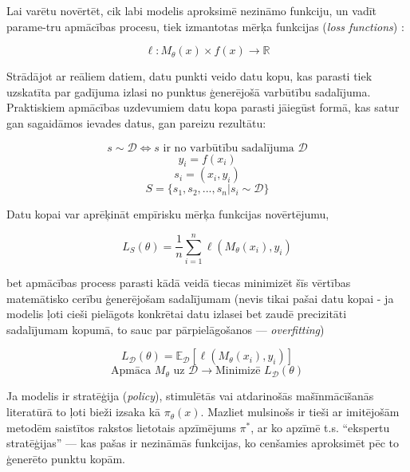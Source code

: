 \documentclass[12pt, a4paper]{article}
\numberwithin{equation}{section} %
\begin{document}
Lai varētu novērtēt, cik labi modelis aproksimē nezināmo funkciju, un vadīt parame-tru apmācības procesu, tiek izmantotas mērķa funkcijas (\textit{loss functions}) \cite{notation}:

\begin{equation} 
    \ell: M_{\theta}(x) \times f(x) \rightarrow \mathbb{R}
\end{equation}

Strādājot ar reāliem datiem, datu punkti veido datu kopu, kas parasti tiek uzskatīta par gadījuma izlasi no punktus ģenerējošā varbūtību sadalījuma. Praktiskiem apmācības uzdevumiem datu kopa parasti jāiegūst formā, kas satur gan sagaidāmos ievades datus, gan pareizu rezultātu:

\begin{equation} 
    s \sim \mathcal{D} \Leftrightarrow s \text{ ir no varbūtību sadalījuma } \mathcal{D}
\end{equation}
\begin{equation} 
    y_i = f(x_i)
\end{equation}
\begin{equation} 
    s_i = (x_i, y_i)
\end{equation}
\begin{equation} 
    S = \lbrace s_1, s_2, ..., s_n \vert s_i \sim \mathcal{D}\rbrace
\end{equation}

Datu kopai var aprēķināt empīrisku mērķa funkcijas novērtējumu,

\begin{equation} 
    L_S(\theta) = \frac{1}{n}\sum_{i=1}^n\ell(M_{\theta}(x_i), y_i)
\end{equation}

bet apmācības process parasti kādā veidā tiecas minimizēt šīs vērtības matemātisko cerību ģenerējošam sadalījumam (nevis tikai pašai datu kopai - ja modelis ļoti cieši pielāgots konkrētai datu izlasei bet zaudē precizitāti sadalījumam kopumā, to sauc par pārpielāgošanos --- \textit{overfitting})

\begin{equation} 
    L_{\mathcal{D}}(\theta) = \mathbb{E}_{\mathcal{D}} [\ell(M_{\theta}(x_i), y_i)]
\end{equation}
\begin{equation} 
    \text{Apmāca } M_{\theta} \text{ uz } \mathcal{D} \rightarrow \text{Minimizē } L_{\mathcal{D}}(\theta)
\end{equation}

Ja modelis ir stratēģija (\textit{policy}), stimulētās vai atdarinošās mašīnmācīšanās literatūrā to ļoti bieži izsaka kā $\pi_{\theta}(x)$. Mazliet mulsinošs ir tieši ar imitējošām metodēm saistītos rakstos lietotais apzīmējums $\pi^*$, ar ko apzīmē t.s. ``ekspertu stratēģijas'' --- kas pašas ir nezināmās funkcijas, ko cenšamies aproksimēt pēc to ģenerēto punktu kopām. 
\end{document}
